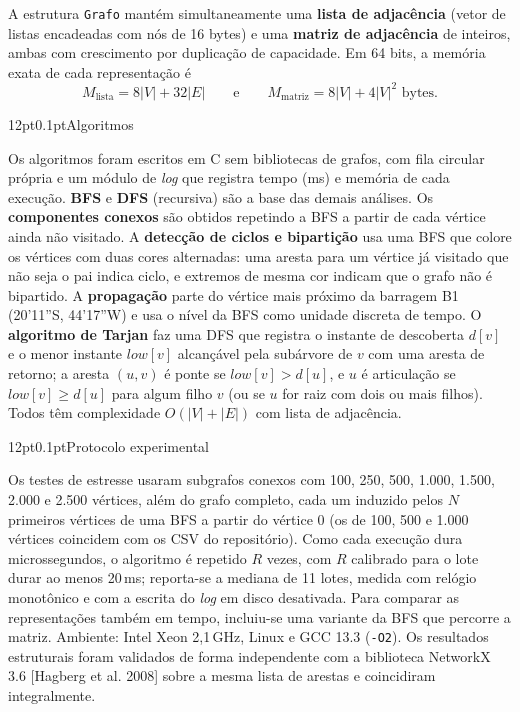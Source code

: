 \documentclass[12pt,a4paper]{article}
\makeatletter
\renewcommand\subsection{\@startsection{subsection}{2}{\z@}%
  {12pt}{0.1pt}{\normalfont\normalsize\bfseries}}
\makeatother
\begin{document}
A estrutura \texttt{Grafo} mantém simultaneamente uma \textbf{lista de adjacência} (vetor de listas encadeadas com nós de 16 bytes) e uma \textbf{matriz de adjacência} de inteiros, ambas com crescimento por duplicação de capacidade. Em 64 bits, a memória exata de cada representação é
\begin{equation}
M_{\text{lista}} = 8|V| + 32|E| \qquad\text{e}\qquad M_{\text{matriz}} = 8|V| + 4|V|^2 \text{ bytes.}
\label{eq:memoria}
\end{equation}

\subsection{Algoritmos}

Os algoritmos foram escritos em C sem bibliotecas de grafos, com fila circular própria e um módulo de \emph{log} que registra tempo (ms) e memória de cada execução. \textbf{BFS} e \textbf{DFS} (recursiva) são a base das demais análises. Os \textbf{componentes conexos} são obtidos repetindo a BFS a partir de cada vértice ainda não visitado. A \textbf{detecção de ciclos e bipartição} usa uma BFS que colore os vértices com duas cores alternadas: uma aresta para um vértice já visitado que não seja o pai indica ciclo, e extremos de mesma cor indicam que o grafo não é bipartido. A \textbf{propagação} parte do vértice mais próximo da barragem B1 (20'11''S, 44'17''W) e usa o nível da BFS como unidade discreta de tempo. O \textbf{algoritmo de Tarjan} faz uma DFS que registra o instante de descoberta $d[v]$ e o menor instante $low[v]$ alcançável pela subárvore de $v$ com uma aresta de retorno; a aresta $(u,v)$ é ponte se $low[v] > d[u]$, e $u$ é articulação se $low[v] \ge d[u]$ para algum filho $v$ (ou se $u$ for raiz com dois ou mais filhos). Todos têm complexidade $O(|V|+|E|)$ com lista de adjacência.

\subsection{Protocolo experimental}

Os testes de estresse usaram subgrafos conexos com 100, 250, 500, 1.000, 1.500, 2.000 e 2.500 vértices, além do grafo completo, cada um induzido pelos $N$ primeiros vértices de uma BFS a partir do vértice 0 (os de 100, 500 e 1.000 vértices coincidem com os CSV do repositório). Como cada execução dura microssegundos, o algoritmo é repetido $R$ vezes, com $R$ calibrado para o lote durar ao menos 20\,ms; reporta-se a mediana de 11 lotes, medida com relógio monotônico e com a escrita do \emph{log} em disco desativada. Para comparar as representações também em tempo, incluiu-se uma variante da BFS que percorre a matriz. Ambiente: Intel Xeon 2,1\,GHz, Linux e GCC 13.3 (\texttt{-O2}). Os resultados estruturais foram validados de forma independente com a biblioteca NetworkX 3.6 [Hagberg et al. 2008] sobre a mesma lista de arestas e coincidiram integralmente.
\end{document}
